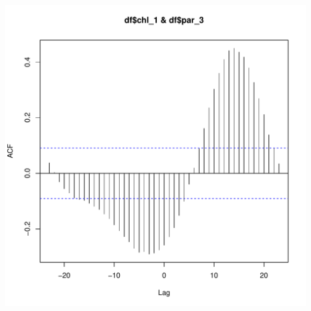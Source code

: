 \documentclass{article}\usepackage[]{graphicx}\usepackage[]{color}
\makeatletter
\def\maxwidth{ %
  \ifdim\Gin@nat@width>\linewidth
    \linewidth
  \else
    \Gin@nat@width
  \fi
}
\newenvironment{knitrout}{}{} %
\makeatother
\begin{document}
\begin{knitrout}
\includegraphics[width=\maxwidth]{figure/unnamed-chunk-17-2} 

\end{knitrout}
\end{document}
